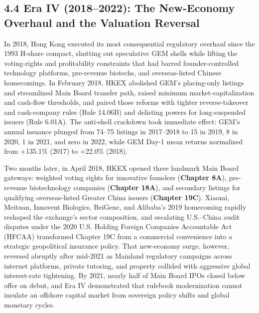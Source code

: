 \documentclass[11pt,letterpaper]{article}
\begin{document}
\subsection*{\texorpdfstring{4.4 Era IV (2018–2022): The New-Economy Overhaul and the Valuation Reversal}{4.4 Era IV (2018–2022): The New-Economy Overhaul and the Valuation Reversal}}
In 2018, Hong Kong executed its most consequential regulatory overhaul since the 1993 H-share compact, shutting out speculative GEM shells while lifting the voting-rights and profitability constraints that had barred founder-controlled technology platforms, pre-revenue biotechs, and overseas-listed Chinese homecomings. In February 2018, HKEX abolished GEM's placing-only listings and streamlined Main Board transfer path, raised minimum market-capitalization and cash-flow thresholds, and paired those reforms with tighter reverse-takeover and cash-company rules (Rule 14.06B) and delisting powers for long-suspended issuers (Rule 6.01A). The anti-shell crackdown took immediate effect: GEM's annual issuance plunged from 74–75 listings in 2017–2018 to 15 in 2019, 8 in 2020, 1 in 2021, and zero in 2022, while GEM Day-1 mean returns normalized from +135.1\% (2017) to +22.0\% (2018).

Two months later, in April 2018, HKEX opened three landmark Main Board gateways: weighted voting rights for innovative founders (\textbf{Chapter 8A}), pre-revenue biotechnology companies (\textbf{Chapter 18A}), and secondary listings for qualifying overseas-listed Greater China issuers (\textbf{Chapter 19C}). Xiaomi, Meituan, Innovent Biologics, BeiGene, and Alibaba's 2019 homecoming rapidly reshaped the exchange's sector composition, and escalating U.S.–China audit disputes under the 2020 U.S. Holding Foreign Companies Accountable Act (HFCAA) transformed Chapter 19C from a commercial convenience into a strategic geopolitical insurance policy. That new-economy surge, however, reversed abruptly after mid-2021 as Mainland regulatory campaigns across internet platforms, private tutoring, and property collided with aggressive global interest-rate tightening. By 2021, nearly half of Main Board IPOs closed below offer on debut, and Era IV demonstrated that rulebook modernization cannot insulate an offshore capital market from sovereign policy shifts and global monetary cycles.
\end{document}
